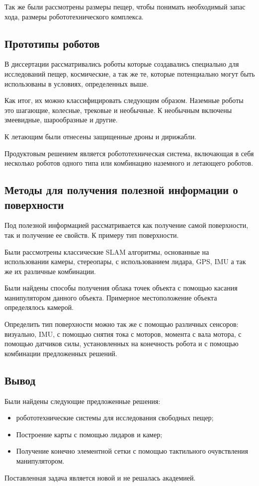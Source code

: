 Так же были рассмотрены размеры пещер, чтобы понимать необходимый запас хода, размеры робототехнического комплекса.

\subsection{Прототипы роботов}

В диссертации рассматривались роботы которые создавались специально для исследований пещер, космические, а так же те, которые потенциально могут быть использованы в условиях, определенных выше.

Как итог, их можно классифицировать следующим образом. Наземные роботы это шагающие, колесные, трековые и необычные. К необычным включены змеевидные, шарообразные и другие.

К летающим были отнесены защищенные дроны и дирижабли.

Продуктовым решением является робототехническая система, включающая в себя несколько роботов одного типа или комбинацию наземного и летающего роботов.

\subsection{Методы для получения полезной информации о поверхности}

Под полезной информацией рассматривается как получение самой поверхности, так и получение ее свойств. К примеру тип поверхности.

Были рассмотрены классические SLAM алгоритмы, основанные на использовании камеры, стереопары, с использованием лидара, GPS, IMU а так же их различные комбинации.

Были найдены способы получения облака точек объекта с помощью касания манипулятором данного объекта. Примерное местоположение объекта определялось камерой.

Определить тип поверхности можно так же с помощью различных сенсоров: визуально, IMU, с помощью снятия тока с моторов, момента с вала мотора, с помощью датчиков силы, установленных на конечность робота и с помощью комбинации предложенных решений.

\subsection{Вывод}
Были найдены следующие предложенные решения:
\begin{itemize}
    \item робототехнические системы для исследования свободных пещер;
    \item Построение карты с помощью лидаров и камер;
    \item Получение конечно элементной сетки с помощью тактильного очувствления манипулятором.
\end{itemize}

Поставленная задача является новой и не решалась академией.